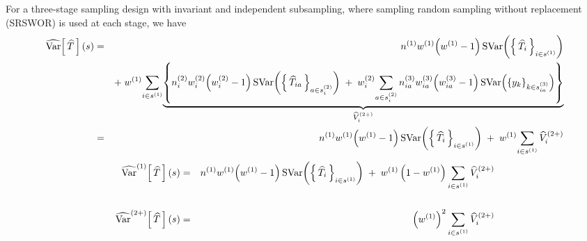 \begin{corollary}\mbox{}\vskip 0.1cm
\noindent
For a three-stage sampling design with invariant and independent subsampling,
where sampling random sampling without replacement (SRSWOR) is used at each stage, we have
\begin{eqnarray*}
\widehat{\Var}\!\left[\,\widehat{T}\,\right](s)
&=& n^{(1)}w^{(1)}\!\left(w^{(1)}-1\right)\SVar\!\left(\left\{\,\widehat{T}_{i}\,\right\}_{i \in s^{(1)}}\right)\\
&& +\;
w^{(1)}\underset{i\in s^{(1)}}{\sum}
\underset{\widehat{V}^{(2+)}_{i}}{
\underbrace{
\left\{
n^{(2)}_{i}w^{(2)}_{i}\!\left(w^{(2)}_{i}-1\right)\SVar\!\left(\left\{\,\widehat{T}_{ia}\,\right\}_{a\in s^{(2)}_{i}}\right)
\;+\;
w^{(2)}_{i}\underset{a \in s^{(2)}_{i}}{\sum}\,n^{(3)}_{ia} w^{(3)}_{ia}\!\left(w^{(3)}_{ia}-1\right)\SVar\!\left(\left\{y_{k}\right\}_{k\in s^{(3)}_{ia}}\right)
\right\}
}%
}%
\\
&=& n^{(1)}w^{(1)}\!\left(w^{(1)}-1\right)\SVar\!\left(\left\{\,\widehat{T}_{i}\,\right\}_{i \in s^{(1)}}\right)\;+\;w^{(1)}\underset{i\in s^{(1)}}{\sum}\,\widehat{V}^{(2+)}_{i}
\end{eqnarray*}
\begin{eqnarray*}
\widehat{\Var}^{(1)}\!\left[\,\widehat{T}\,\right](s)
&=& n^{(1)}w^{(1)}\!\left(w^{(1)}-1\right)\SVar\!\left(\left\{\,\widehat{T}_{i}\,\right\}_{i \in s^{(1)}}\right)
\;+\;w^{(1)}\left(1 - w^{(1)}\right)\underset{i\in s^{(1)}}{\sum}\,\widehat{V}^{(2+)}_{i}
\\ {\color{white}1} \\
\widehat{\Var}^{(2+)}\!\left[\,\widehat{T}\,\right](s)
&=& \left(w^{(1)}\right)^{2}\underset{i\in s^{(1)}}{\sum}\,\widehat{V}^{(2+)}_{i}
\end{eqnarray*}
\end{corollary}







